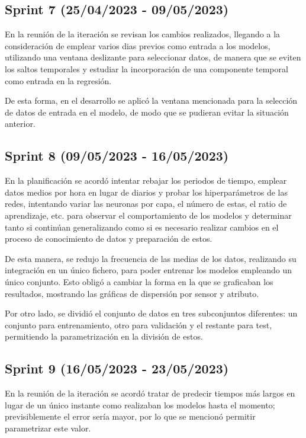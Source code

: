 \subsection{Sprint 7 (25/04/2023 - 09/05/2023)}
En la reunión de la iteración se revisan los cambios realizados, llegando a la consideración de emplear varios dias previos como entrada a los modelos,
utilizando una ventana deslizante para seleccionar datos, de manera que se eviten los saltos temporales y estudiar la incorporación de una componente temporal 
como entrada en la regresión.

De esta forma, en el desarrollo se aplicó la ventana mencionada para la selección de datos de entrada en el modelo, de modo que se pudieran evitar la situación
anterior.

\subsection{Sprint 8 (09/05/2023 - 16/05/2023)}
En la planificación se acordó intentar rebajar los periodos de tiempo, emplear datos medios por hora en lugar de diarios y probar los hiperparámetros
de las redes, intentando variar las neuronas por capa, el número de estas, el ratio de aprendizaje, etc. para observar el comportamiento de los modelos y
determinar tanto si continúan generalizando como si es necesario realizar cambios en el proceso de conocimiento de datos y preparación de estos.

De esta manera, se redujo la frecuencia de las medias de los datos, realizando su integración en un único fichero, para poder
entrenar los modelos empleando un único conjunto. Esto obligó a cambiar la forma en la que se graficaban los resultados, mostrando las gráficas de 
dispersión por sensor y atributo.

Por otro lado, se dividió el conjunto de datos en tres subconjuntos diferentes: un conjunto para entrenamiento, otro para validación y el restante para test, 
permitiendo la parametrización en la división de estos.

\subsection{Sprint 9 (16/05/2023 - 23/05/2023)}
En la reunión de la iteración se acordó tratar de predecir tiempos más largos en lugar de un único instante como realizaban los modelos hasta el momento;
previsiblemente el error sería mayor, por lo que se mencionó permitir parametrizar este valor.

